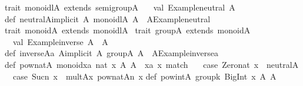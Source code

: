 \begin{isabellebody}
\begin{isamarkuptext}
\begin{typewriter}
\isanewline
trait\ monoidl{\isacharbrackleft}A{\isacharbrackright}\ extends\ semigroup{\isacharbrackleft}A{\isacharbrackright}\ {\isacharbraceleft}\isanewline
\ \ val\ {\isacharbackquote}Example{\isachardot}neutral{\isacharbackquote}{\isacharcolon}\ A\isanewline
{\isacharbraceright}\isanewline
def\ neutral{\isacharbrackleft}A{\isacharbrackright}{\isacharparenleft}implicit\ A{\isacharcolon}\ monoidl{\isacharbrackleft}A{\isacharbrackright}{\isacharparenright}{\isacharcolon}\ A\ {\isacharequal}\ A{\isachardot}{\isacharbackquote}Example{\isachardot}neutral{\isacharbackquote}\isanewline
\isanewline
trait\ monoid{\isacharbrackleft}A{\isacharbrackright}\ extends\ monoidl{\isacharbrackleft}A{\isacharbrackright}\ {\isacharbraceleft}\isanewline
{\isacharbraceright}\isanewline
\isanewline
trait\ group{\isacharbrackleft}A{\isacharbrackright}\ extends\ monoid{\isacharbrackleft}A{\isacharbrackright}\ {\isacharbraceleft}\isanewline
\ \ val\ {\isacharbackquote}Example{\isachardot}inverse{\isacharbackquote}{\isacharcolon}\ A\ {\isacharequal}{\isachargreater}\ A\isanewline
{\isacharbraceright}\isanewline
def\ inverse{\isacharbrackleft}A{\isacharbrackright}{\isacharparenleft}a{\isacharcolon}\ A{\isacharparenright}{\isacharparenleft}implicit\ A{\isacharcolon}\ group{\isacharbrackleft}A{\isacharbrackright}{\isacharparenright}{\isacharcolon}\ A\ {\isacharequal}\ A{\isachardot}{\isacharbackquote}Example{\isachardot}inverse{\isacharbackquote}{\isacharparenleft}a{\isacharparenright}\isanewline
\isanewline
def\ pow{\isacharunderscore}nat{\isacharbrackleft}A{\isacharcolon}\ monoid{\isacharbrackright}{\isacharparenleft}xa{}{\isacharcolon}\ nat{\isacharcomma}\ x{\isacharcolon}\ A{\isacharparenright}{\isacharcolon}\ A\ {\isacharequal}\ {\isacharparenleft}xa{}{\isacharcomma}\ x{\isacharparenright}\ match\ {\isacharbraceleft}\isanewline
\ \ case\ {\isacharparenleft}Zero{\isacharunderscore}nat{\isacharcomma}\ x{\isacharparenright}\ {\isacharequal}{\isachargreater}\ neutral{\isacharbrackleft}A{\isacharbrackright}\isanewline
\ \ case\ {\isacharparenleft}Suc{\isacharparenleft}n{\isacharparenright}{\isacharcomma}\ x{\isacharparenright}\ {\isacharequal}{\isachargreater}\ mult{\isacharbrackleft}A{\isacharbrackright}{\isacharparenleft}x{\isacharcomma}\ pow{\isacharunderscore}nat{\isacharbrackleft}A{\isacharbrackright}{\isacharparenleft}n{\isacharcomma}\ x{\isacharparenright}{\isacharparenright}\isanewline
{\isacharbraceright}\isanewline
\isanewline
def\ pow{\isacharunderscore}int{\isacharbrackleft}A{\isacharcolon}\ group{\isacharbrackright}{\isacharparenleft}k{\isacharcolon}\ BigInt{\isacharcomma}\ x{\isacharcolon}\ A{\isacharparenright}{\isacharcolon}\ A\ {\isacharequal}\isanewline

\end{typewriter}
\end{isamarkuptext}
\end{isabellebody}
